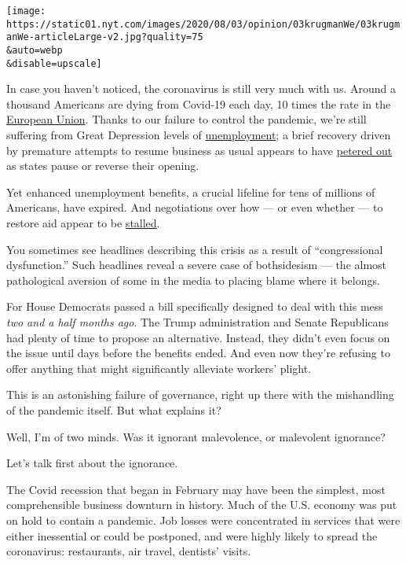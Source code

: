 \texttt{[image: https://static01.nyt.com/images/2020/08/03/opinion/03krugmanWe/03krugmanWe-articleLarge-v2.jpg?quality=75\\\&auto=webp\\\&disable=upscale]}

In case you haven't noticed, the coronavirus is still very much with us.
Around a thousand Americans are dying from Covid-19 each day, 10 times
the rate in the
\href{https://ourworldindata.org/coronavirus-data-explorer?zoomToSelection=true\&deathsMetric=true\&interval=smoothed\&smoothing=7\&country=USA~EuropeanUnion\&pickerMetric=location\&pickerSort=asc}{European
Union}. Thanks to our failure to control the pandemic, we're still
suffering from Great Depression levels of
\href{https://www.nytimes.com/2020/08/06/business/economy/unemployment-claims.html}{unemployment};
a brief recovery driven by premature attempts to resume business as
usual appears to have
\href{https://www.calculatedriskblog.com/2020/08/forecasts-for-july-employment-report.html}{petered
out} as states pause or reverse their opening.

Yet enhanced unemployment benefits, a crucial lifeline for tens of
millions of Americans, have expired. And negotiations over how --- or
even whether --- to restore aid appear to be
\href{https://www.nytimes.com/2020/08/02/us/politics/coronavirus-jobless-aid.html?action=click\&module=Top\%20Stories\&pgtype=Homepage}{stalled}.

You sometimes see headlines describing this crisis as a result of
``congressional dysfunction.'' Such headlines reveal a severe case of
bothsidesism --- the almost pathological aversion of some in the media
to placing blame where it belongs.

For House Democrats passed a bill specifically designed to deal with
this mess \emph{two and a half months ago}. The Trump administration and
Senate Republicans had plenty of time to propose an alternative.
Instead, they didn't even focus on the issue until days before the
benefits ended. And even now they're refusing to offer anything that
might significantly alleviate workers' plight.

This is an astonishing failure of governance, right up there with the
mishandling of the pandemic itself. But what explains it?

Well, I'm of two minds. Was it ignorant malevolence, or malevolent
ignorance?

Let's talk first about the ignorance.

The Covid recession that began in February may have been the simplest,
most comprehensible business downturn in history. Much of the U.S.
economy was put on hold to contain a pandemic. Job losses were
concentrated in services that were either inessential or could be
postponed, and were highly likely to spread the coronavirus:
restaurants, air travel, dentists' visits.

